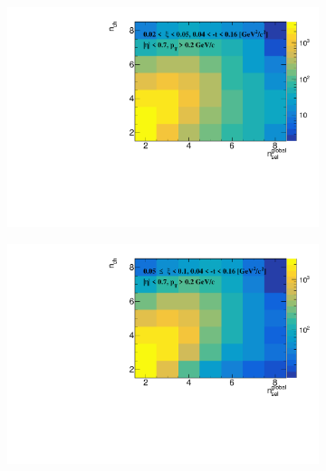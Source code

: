 \captionsetup{format=plain,indention=0pt,justification=justified}
\begin{figure}[h!]
	\centering
	\begin{subfigure}{.49\textwidth}
		\includegraphics[width=\textwidth,page=1]{chapters/chrgSTAR/img/unfolding/matrix_0.pdf}
	\end{subfigure}
	\begin{subfigure}{.49\textwidth}
		\includegraphics[width=\textwidth,page=1]{chapters/chrgSTAR/img/unfolding/matrix_1.pdf}
	\end{subfigure}
	\begin{subfigure}{.49\textwidth}

\end{subfigure}
\end{figure}
